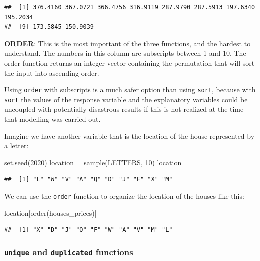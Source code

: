 \documentclass[
]{book}
\newenvironment{Shaded}{\begin{snugshade}}{\end{snugshade}}
\newcommand{\DecValTok}[1]{\textcolor[rgb]{0.00,0.00,0.81}{#1}}
\newcommand{\FunctionTok}[1]{\textcolor[rgb]{0.00,0.00,0.00}{#1}}
\newcommand{\NormalTok}[1]{#1}
\newcommand{\OtherTok}[1]{\textcolor[rgb]{0.56,0.35,0.01}{#1}}
\begin{document}
\begin{verbatim}
##  [1] 376.4160 367.0721 366.4756 316.9119 287.9790 287.5913 197.6340 195.2034
##  [9] 173.5845 150.9039
\end{verbatim}

\textbf{ORDER}: This is the most important of the three functions, and the hardest to understand. The numbers in this column are subscripts between 1 and 10. The order function returns an integer vector containing the permutation that will sort the input into ascending order.

Using \texttt{order} with subscripts is a much safer option than using \texttt{sort}, because with \texttt{sort} the values of the response variable and the explanatory variables could be uncoupled with potentially disastrous results if this is not realized at the time that modelling was carried out.

Imagine we have another variable that is the location of the house represented by a letter:

\begin{Shaded}
\begin{Highlighting}[]
\FunctionTok{set.seed}\NormalTok{(}\DecValTok{2020}\NormalTok{)}
\NormalTok{location }\OtherTok{=} \FunctionTok{sample}\NormalTok{(LETTERS, }\DecValTok{10}\NormalTok{)}
\NormalTok{location}
\end{Highlighting}
\end{Shaded}

\begin{verbatim}
##  [1] "L" "W" "V" "A" "Q" "D" "J" "F" "X" "M"
\end{verbatim}

We can use the \texttt{order} function to organize the location of the houses like this:

\begin{Shaded}
\begin{Highlighting}[]
\NormalTok{location[}\FunctionTok{order}\NormalTok{(houses\_prices)]}
\end{Highlighting}
\end{Shaded}

\begin{verbatim}
##  [1] "X" "D" "J" "Q" "F" "W" "A" "V" "M" "L"
\end{verbatim}

\hypertarget{unique-and-duplicated-functions}{%
\subsubsection{\texorpdfstring{\texttt{unique} and \texttt{duplicated} functions}{unique and duplicated functions}}\label{unique-and-duplicated-functions}}
\end{document}
